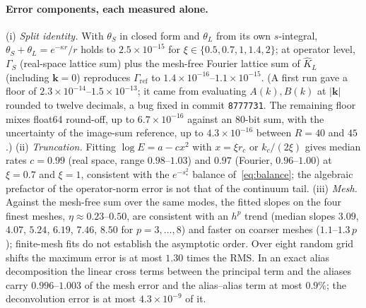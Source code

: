 \documentclass[11pt]{article}
\DeclareRobustCommand{\_}{\textunderscore\allowbreak}
\theoremstyle{remark}
\theoremstyle{definition}
\newcommand{\bk}{\mathbf{k}}
\newcommand{\Gref}{\Gamma_{\mathrm{ref}}}
\begin{document}
\paragraph{Error components, each measured alone.}
(i) \emph{Split identity.} With $\theta_S$ in closed form and $\theta_L$ from its own $s$-integral, $\theta_S+\theta_L=e^{-\kappa r}/r$
holds to $2.5\times10^{-15}$ for $\xi\in\{0.5,0.7,1,1.4,2\}$; at operator level, $\Gamma_S$ (real-space lattice sum) plus the
mesh-free Fourier lattice sum of $\hat K_L$ (including $\bk=0$) reproduces $\Gref$ to $1.4\times10^{-16}$--$1.1\times10^{-15}$. (A first run
gave a floor of $2.3\times10^{-14}$--$1.5\times10^{-13}$; it came from evaluating $A(k),B(k)$ at $|\bk|$ rounded to twelve decimals, a bug
fixed in commit \texttt{8777731}. The remaining floor mixes float64 round-off, up to $6.7\times10^{-16}$ against an 80-bit sum, with the
uncertainty of the image-sum reference, up to $4.3\times10^{-16}$ between $R=40$ and $45$.)
(ii) \emph{Truncation.} Fitting $\log E=a-cx^2$ with $x=\xi r_c$ or $k_c/(2\xi)$ gives median rates $c=0.99$ (real space, range
$0.98$--$1.03$) and $0.97$ (Fourier, $0.96$--$1.00$) at $\xi=0.7$ and $\xi=1$, consistent with the $e^{-s_\ast^2}$ balance
of~\eqref{eq:balance}; the algebraic prefactor of the operator-norm error is not that of the continuum tail.
(iii) \emph{Mesh.} Against the mesh-free sum over the same modes, the fitted slopes on the four finest meshes, $\eta\approx0.23$--$0.50$, are
consistent with an $h^p$ trend (median slopes $3.09$, $4.07$, $5.24$, $6.19$, $7.46$, $8.50$ for $p=3,\dots,8$) and faster on coarser meshes ($1.1$--$1.3\,p$); finite-mesh
fits do not establish the asymptotic order. Over eight random grid shifts the maximum error is at most $1.30$ times the RMS. In an exact
alias decomposition the linear cross terms between the principal term and the aliases carry $0.996$--$1.003$ of the mesh error and the
alias--alias term at most $0.9\%$; the deconvolution error is at most $4.3\times10^{-9}$ of it.
\end{document}
